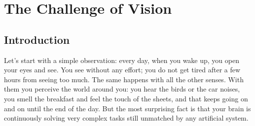%	
%	
%	 
%



\chapter{The Challenge of Vision}
\label{chap:challenge_of_vision}




\section{Introduction}

Let's start with a simple observation: every day, when you wake up, you open your eyes and see. You see without any effort; you do not get tired after a few hours from seeing too much. The same happens with all the other senses. With them you perceive the world around you: you hear the birds or the car noises, you smell the breakfast and feel the touch of the sheets, and that keeps going on and on until the end of the day. But the most surprising fact is that your brain is continuously solving very complex tasks still unmatched by any artificial system. 

